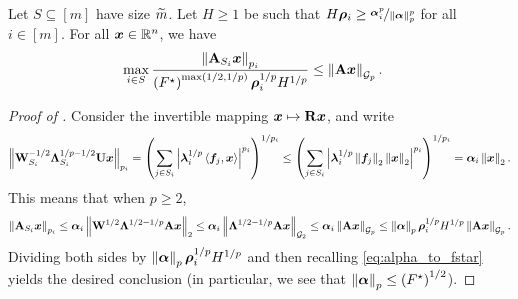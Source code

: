 \documentclass[11pt]{article}
\numberwithin{equation}{section}
\begin{document}
\begin{lemma}
\label{lemma:containments}
Let $S \subseteq [m]$ have size $\widetilde{m}$. Let $H \ge 1$ be such that $H\bm{\rho}_i \ge \nicefrac{\bm{\alpha}_i^p}{\left\lVert \bm{\alpha} \right\rVert_p^p}$ for all $i \in [m]$. For all $\bm{x}\in\mathbb{R}^n$, we have
\begin{align*}
    \max_{i \in S} \frac{\left\lVert \mathbf{A}_{S_i}\bm{x} \right\rVert_{p_i}}{\left(F^{\star}\right)^{\max(1/2,1/p)}\bm{\rho}_i^{1/p}H^{1/p}} &\le \left\lVert \mathbf{A}\bm{x} \right\rVert_{\mathcal{G}_{p}}.
\end{align*}
\end{lemma}
\begin{proof}[Proof of ]
Consider the invertible mapping $\bm{x} \mapsto \mathbf{R}\bm{x}$, and write
\begin{align}
    \left\lVert \mathbf{W}^{-1/2}_{S_i}\mathbf{\Lambda}^{1/p-1/2}_{S_i}\mathbf{U}\bm{x} \right\rVert_{p_i} = \left(\sum_{j \in S_i} \left\lvert \bm{\lambda}_i^{1/p}\left\langle \bm{f}_j,\bm{x} \right\rangle \right\rvert^{p_i}\right)^{1/p_i} \le \left(\sum_{j \in S_i} \left\lvert \bm{\lambda}_i^{1/p}\left\lVert \bm{f}_j \right\rVert_2\left\lVert \bm{x} \right\rVert_2 \right\rvert^{p_i}\right)^{1/p_i} = \bm{\alpha}_i\left\lVert \bm{x} \right\rVert_2.\label{eq:alpha_importance_proof}
\end{align}
This means that when $p \ge 2$,
\begin{align*}
    \left\lVert \mathbf{A}_{S_i}\bm{x} \right\rVert_{p_i} \le \bm{\alpha}_i\left\lVert \mathbf{W}^{1/2}\mathbf{\Lambda}^{1/2-1/p}\mathbf{A}\bm{x} \right\rVert_2 \le \bm{\alpha}_i\left\lVert \mathbf{\Lambda}^{1/2-1/p}\mathbf{A}\bm{x} \right\rVert_{\mathcal{G}_{2}} \le \bm{\alpha}_i\left\lVert \mathbf{A}\bm{x} \right\rVert_{\mathcal{G}_{p}} \le \left\lVert \bm{\alpha} \right\rVert_p\bm{\rho}_i^{1/p}H^{1/p}\left\lVert \mathbf{A}\bm{x} \right\rVert_{\mathcal{G}_{p}}.
\end{align*}
Dividing both sides by $\left\lVert \bm{\alpha} \right\rVert_p\bm{\rho}_i^{1/p}H^{1/p}$ and then recalling \eqref{eq:alpha_to_fstar} yields the desired conclusion (in particular, we see that $\left\lVert \bm{\alpha} \right\rVert_p \le \left(F^{\star}\right)^{1/2}$).


\end{proof}
\end{document}
